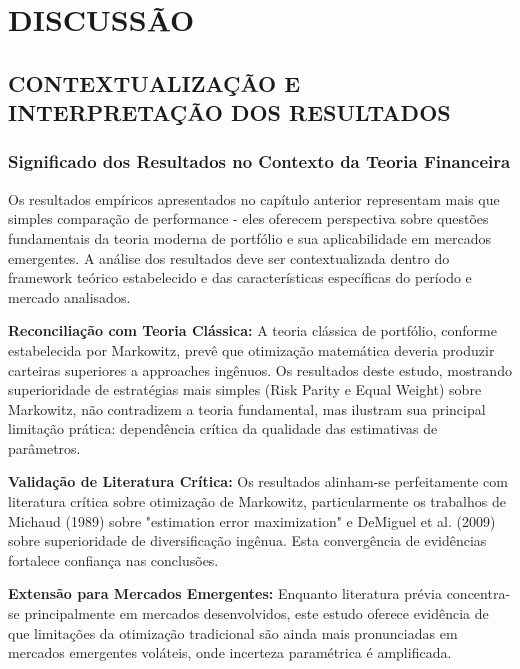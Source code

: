 
\chapter{DISCUSSÃO}

\section{CONTEXTUALIZAÇÃO E INTERPRETAÇÃO DOS RESULTADOS}

\subsection{Significado dos Resultados no Contexto da Teoria Financeira}

Os resultados empíricos apresentados no capítulo anterior representam mais que simples comparação de performance - eles oferecem perspectiva sobre questões fundamentais da teoria moderna de portfólio e sua aplicabilidade em mercados emergentes. A análise dos resultados deve ser contextualizada dentro do framework teórico estabelecido e das características específicas do período e mercado analisados.

\textbf{Reconciliação com Teoria Clássica:} A teoria clássica de portfólio, conforme estabelecida por Markowitz, prevê que otimização matemática deveria produzir carteiras superiores a approaches ingênuos. Os resultados deste estudo, mostrando superioridade de estratégias mais simples (Risk Parity e Equal Weight) sobre Markowitz, não contradizem a teoria fundamental, mas ilustram sua principal limitação prática: dependência crítica da qualidade das estimativas de parâmetros.

\textbf{Validação de Literatura Crítica:} Os resultados alinham-se perfeitamente com literatura crítica sobre otimização de Markowitz, particularmente os trabalhos de Michaud (1989) sobre "estimation error maximization" e DeMiguel et al. (2009) sobre superioridade de diversificação ingênua. Esta convergência de evidências fortalece confiança nas conclusões.

\textbf{Extensão para Mercados Emergentes:} Enquanto literatura prévia concentra-se principalmente em mercados desenvolvidos, este estudo oferece evidência de que limitações da otimização tradicional são ainda mais pronunciadas em mercados emergentes voláteis, onde incerteza paramétrica é amplificada.

